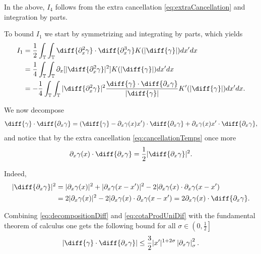 \documentclass[a4paper]{amsart}
\theoremstyle{definition}
\newcommand{\T}{\ensuremath{\mathbb{T}}}
\newcommand{\SNa}[2][\gamma]{\ensuremath{\left|#2\right|_{#1}}}
\newcommand{\intTT}{\ensuremath{\int_\T\int_\T}}
\begin{document}
    In the above, $I_4$ follows from the extra cancellation \eqref{eq:extraCancellation} and integration by parts.
    
    To bound $I_1$ we start by symmetrizing and integrating by parts, which yields
    \begin{align*}
        I_1&=\frac{1}{2}\intTT \diff{\partial_x^2\gamma}\cdot\diff{\partial_x^3\gamma} K(|\diff{\gamma}|)dx'dx \\
         &=\frac{1}{4}\intTT \partial_x [|\diff{\partial_x^2\gamma}|^2] K(|\diff{\gamma}|)dx'dx \\
         &=-\frac{1}{4} \intTT |\diff{\partial_x^2\gamma}|^2 \frac{\diff{\gamma} \cdot \diff{\partial_x\gamma}}{|\diff{\gamma}|} K'(|\diff{\gamma}|) dx'dx.
    \end{align*}
    
    We now decompose 
    \begin{equation}    \label{eq:decompositionDiff}
    \diff{\gamma}\cdot \diff{\partial_x\gamma}=(\diff{\gamma}-\partial_x\gamma(x)x')\cdot \diff{\partial_x\gamma}+\partial_x\gamma(x)x'\cdot \diff{\partial_x\gamma},
    \end{equation}
    and notice that by the extra cancellation \eqref{eq:cancellationTemps} once more 
    \begin{equation}\label{eq:cotaProdUniDif}
        \partial_x\gamma(x)\cdot \diff{\partial_x\gamma} = \frac{1}{2}|\diff{\partial_x\gamma}|^2.
    \end{equation}

    Indeed, \begin{equation*}
        \begin{aligned}
                   |\diff{\partial_x\gamma}|^2&=|\partial_x \gamma(x)|^2+|\partial_x\gamma(x-x')|^2-2|\partial_x\gamma(x)\cdot\partial_x\gamma(x-x')\\
                   &=2|\partial_x\gamma(x)|^2-2|\partial_x\gamma(x)\cdot\partial_x\gamma(x-x')=2\partial_x\gamma(x)\cdot \diff{\partial_x\gamma}.
        \end{aligned}
    \end{equation*}
 
    
    Combining \eqref{eq:decompositionDiff} and \eqref{eq:cotaProdUniDif} with the fundamental theorem of calculus one gets the following bound for all $\sigma\in\left(0,\frac{1}{2}\right]$  
    \begin{equation}\label{eq:cotaProdDiferencies}
        |\diff{\gamma}\cdot\diff{\partial_x \gamma} | \leq \frac{3}{2}|x'|^{1+2\sigma} \SNa[\sigma]{\partial_ x \gamma }^2.
    \end{equation}
    
\end{document}
